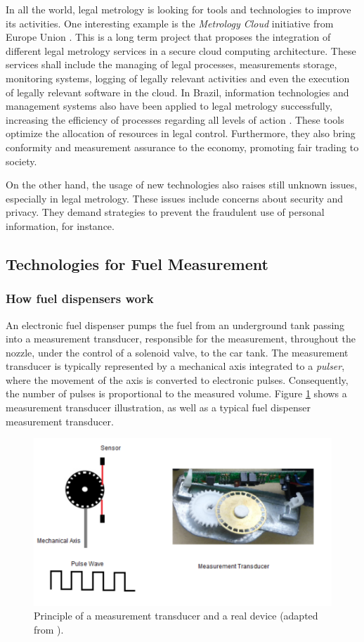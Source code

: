 \documentclass[sigplan]{acmart}
\begin{document}
In all the world, legal metrology is looking for tools and technologies to improve its activities.
One interesting example is the \emph{Metrology Cloud} initiative from Europe Union \cite{Oppermann2018}.
This is a long term project that proposes the integration of different legal metrology services in a secure cloud computing architecture.
These services shall include the managing of legal processes, measurements storage, monitoring systems, logging of legally relevant activities and even the execution of legally relevant software in the cloud.
In Brazil, information technologies and management systems also have been applied to legal metrology successfully, increasing the efficiency of processes regarding all levels of action \cite{RodriguesFilho2015a}.
These tools optimize the allocation of resources in legal control.
Furthermore, they also bring conformity and measurement assurance to the economy, promoting fair trading to society.

On the other hand, the usage of new technologies also raises still unknown issues, especially in legal metrology.
These issues include concerns about security and privacy.
They demand strategies to prevent the fraudulent use of personal information, for instance.

\subsection{Technologies for Fuel Measurement}
\subsubsection{How fuel dispensers work}
An electronic fuel dispenser pumps the fuel from an underground tank passing into a measurement transducer, responsible for the measurement, throughout the nozzle, under the control of a solenoid valve, to the car tank.
The measurement transducer is typically represented by a mechanical axis integrated to a \textit{pulser}, where the movement of the axis is converted to electronic pulses.
Consequently, the number of pulses is proportional to the measured volume.
Figure \ref{f:transducer} shows a measurement transducer illustration, as well as a typical fuel dispenser measurement transducer.

\begin{figure}[!t]
\centering
\includegraphics[width=.45\textwidth]{transducer}
\caption{Principle of a measurement transducer and a real device (adapted from \cite{Leitao2014a}).}
\label{f:transducer}
\end{figure}
\end{document}
